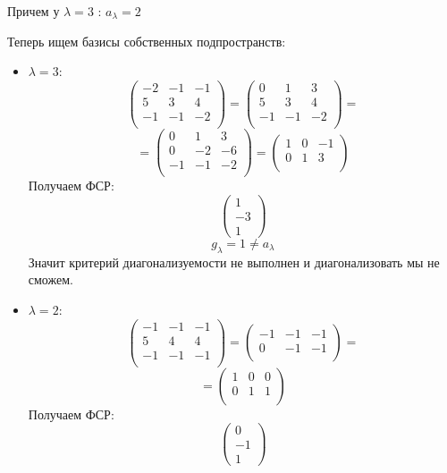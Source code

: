 \documentclass[a4paper,12pt]{article}
\begin{document}
Причем у $\lambda  = 3$ : $a_{\lambda} = 2$

Теперь ищем базисы собственных подпространств:
\begin{itemize}
\item $\lambda = 3$:
\[
\begin{pmatrix}
-2 & -1 & -1 \\
5 & 3 & 4 \\
-1 & -1 & -2 \\
\end{pmatrix}
=
\begin{pmatrix}
0 & 1 & 3 \\
5 & 3 & 4 \\
-1 & -1 & -2 \\
\end{pmatrix}
=
\]
\[
=
\begin{pmatrix}
0 & 1 & 3 \\
0 & -2 & -6  \\
-1 & -1 & -2  \\
\end{pmatrix}
=
\begin{pmatrix}
1 & 0 & -1  \\
0 & 1 & 3 \\
\end{pmatrix}
\]
Получаем ФСР:
\[
\begin{pmatrix}
1 \\ -3 \\ 1
\end{pmatrix}
\]
\[
g_{\lambda} = 1  \neq a_{\lambda}
\]
Значит критерий диагонализуемости не выполнен и диагонализовать мы не сможем.
\item $\lambda = 2$:
\[
\begin{pmatrix}
-1 & -1 & -1 \\
5 & 4 & 4 \\
-1 & -1 & -1 \\
\end{pmatrix}
=
\begin{pmatrix}
-1 & -1 & -1 \\
0 & -1 & -1  \\
\end{pmatrix}
=
\]
\[
=
\begin{pmatrix}
1 & 0 & 0  \\
0 & 1 & 1 \\
\end{pmatrix}
\]
Получаем ФСР:
\[
\begin{pmatrix}
0 \\ -1 \\ 1
\end{pmatrix}
\]
\end{itemize}
\end{document}
